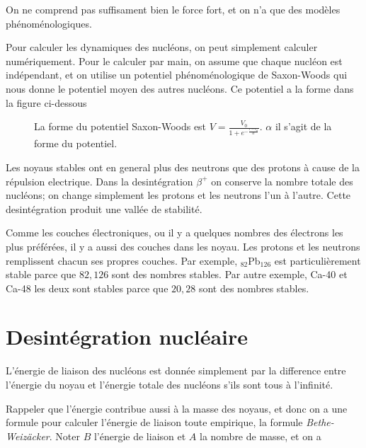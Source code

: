 \documentclass[10pt]{report}
\begin{document}
On ne comprend pas suffisament bien le force fort, et on n'a que des mod\`eles ph\'enom\'enologiques. 

Pour calculer les dynamiques des nucl\'eons, on peut simplement calculer num\'eriquement. Pour le calculer par main, on assume que chaque nucl\'eon est ind\'ependant, et on utilise un potentiel ph\'enom\'enologique de Saxon-Woods qui nous donne le potentiel moyen des autres nucl\'eons. Ce potentiel a la forme dans la figure ci-dessous
\begin{figure}[!h]
    \centering
    \caption{La forme du potentiel Saxon-Woods est $V = \frac{V_0}{1 + e^{-\frac{r-r_0}{\alpha}}}$. $\alpha$ il s'agit de la forme du potentiel.}
    \label{06.10.vsw}
\end{figure}

Les noyaus stables ont en general plus des neutrons que des protons \`a cause de la r\'epulsion electrique. Dans la desint\'egration $\beta^+$ on conserve la nombre totale des nucl\'eons; on change simplement les protons et les neutrons l'un \`a l'autre. Cette desint\'egration produit une vall\'ee de stabilit\'e.

Comme les couches \'electroniques, ou il y a quelques nombres des \'electrons les plus pr\'ef\'er\'ees, il y a aussi des couches dans les noyau. Les protons et les neutrons remplissent chacun ses propres couches. Par exemple, $_{82}$Pb$_{126}$ est particuli\`erement stable parce que $82,126$ sont des nombres stables. Par autre exemple, Ca-40 et Ca-48 les deux sont stables parce que $20,28$ sont des nombres stables. 

\section{Desint\'egration nucl\'eaire}

L'\'energie de liaison des nucl\'eons est donn\'ee simplement par la difference entre l'\'energie du noyau et l'\'energie totale des nucl\'eons s'ils sont tous \`a l'infinit\'e.

Rappeler que l'\'energie contribue aussi \`a la masse des noyaus, et donc on a une formule pour calculer l'\'energie de liaison toute empirique, la formule \emph{Bethe-Weiz\"acker}. Noter $B$ l'\'energie de liaison et $A$ la nombre de masse, et on a
\end{document}
